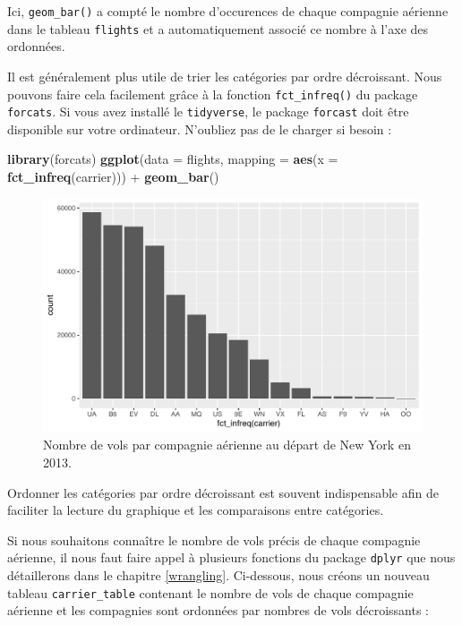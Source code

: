 \documentclass[
  a4paper,
]{article}
\newenvironment{Shaded}{\begin{snugshade}}{\end{snugshade}}
\newcommand{\DataTypeTok}[1]{\textcolor[rgb]{0.00,0.34,0.68}{#1}}
\newcommand{\KeywordTok}[1]{\textcolor[rgb]{0.12,0.11,0.11}{\textbf{#1}}}
\newcommand{\NormalTok}[1]{\textcolor[rgb]{0.12,0.11,0.11}{#1}}
\newcommand{\OperatorTok}[1]{\textcolor[rgb]{0.12,0.11,0.11}{#1}}
\newcommand{\StringTok}[1]{\textcolor[rgb]{0.75,0.01,0.01}{#1}}
\begin{document}
Ici, \texttt{geom\_bar()} a compté le nombre d'occurences de chaque compagnie aérienne dans le tableau \texttt{flights} et a automatiquement associé ce nombre à l'axe des ordonnées.

Il est généralement plus utile de trier les catégories par ordre décroissant. Nous pouvons faire cela facilement grâce à la fonction \texttt{fct\_infreq()} du package \texttt{forcats}. Si vous avez installé le \texttt{tidyverse}, le package \texttt{forcast} doit être disponible sur votre ordinateur. N'oubliez pas de le charger si besoin :

\begin{Shaded}
\begin{Highlighting}[]
\KeywordTok{library}\NormalTok{(forcats)}
\KeywordTok{ggplot}\NormalTok{(}\DataTypeTok{data =}\NormalTok{ flights, }\DataTypeTok{mapping =} \KeywordTok{aes}\NormalTok{(}\DataTypeTok{x =} \KeywordTok{fct_infreq}\NormalTok{(carrier))) }\OperatorTok{+}
\StringTok{  }\KeywordTok{geom_bar}\NormalTok{()}
\end{Highlighting}
\end{Shaded}

\begin{figure}[htpb]

{\centering \includegraphics[width=0.9\linewidth]{figure/bpcarriersorted-1} 

}

\caption{Nombre de vols par compagnie aérienne au départ de New York en 2013.}\label{fig:bpcarriersorted}
\end{figure}

Ordonner les catégories par ordre décroissant est souvent indispensable afin de faciliter la lecture du graphique et les comparaisons entre catégories.

Si nous souhaitons connaître le nombre de vols précis de chaque compagnie aérienne, il nous faut faire appel à plusieurs fonctions du package \texttt{dplyr} que nous détaillerons dans le chapitre \ref{wrangling}. Ci-dessous, nous créons un nouveau tableau \texttt{carrier\_table} contenant le nombre de vols de chaque compagnie aérienne et les compagnies sont ordonnées par nombres de vols décroissants :
\end{document}

